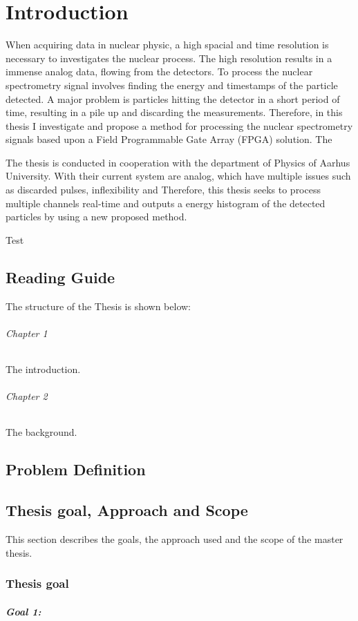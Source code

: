 \chapter{Introduction}
When acquiring data in nuclear physic, a high spacial and time resolution is necessary to investigates the nuclear process. 
The high resolution results in a immense analog data, flowing from the detectors. 
To process the nuclear spectrometry signal involves finding the energy and timestamps of the particle detected.
A major problem is particles hitting the detector in a short period of time, resulting in a pile up and discarding the measurements.\newline
Therefore, in this thesis I investigate and propose a method for processing the nuclear spectrometry signals based upon a Field Programmable Gate Array (FPGA) solution.
The

The thesis is conducted in cooperation with the department of Physics of Aarhus University.
With their current system are analog, which have multiple issues such as discarded pulses, inflexibility and 
Therefore, this thesis seeks to process multiple channels real-time and outputs a energy histogram of the detected particles by using a new proposed method.

Test\cite{LatexModulesLink} \cite{dummy2015}
\section{Reading Guide}
The structure of the Thesis is shown below:
\subparagraph{Chapter 1} The introduction. 
\subparagraph{Chapter 2} The background. 

\section{Problem Definition}

\section{Thesis goal, Approach and Scope}
This section describes the goals, the approach used and the scope of the master thesis.
\subsection{Thesis goal}

\paragraph{Goal 1:}

